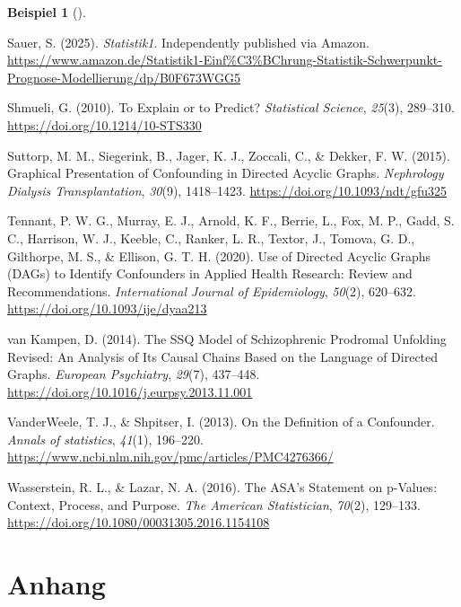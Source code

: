 \documentclass[
  ngerman,
  letterpaper,
  twoside,
  open=any]{scrbook}
\newlength{\cslhangindent}
\newenvironment{CSLReferences}[2] %
 {\begin{list}{}{%
  \setlength{\itemindent}{0pt}
  \setlength{\leftmargin}{0pt}
  \setlength{\parsep}{0pt}
  \ifodd #1
   \setlength{\leftmargin}{\cslhangindent}
   \setlength{\itemindent}{-1\cslhangindent}
  \fi
  \setlength{\itemsep}{#2\baselineskip}}}
 {\end{list}}
\theoremstyle{definition}
\newtheorem{example}{Beispiel}[chapter]
\theoremstyle{plain}
\theoremstyle{definition}
\theoremstyle{definition}
\theoremstyle{remark}
\begin{document}
\begin{example}[]
\begin{CSLReferences}{1}{0}
Sauer, S. (2025). \emph{Statistik1}. Independently published via Amazon.
\url{https://www.amazon.de/Statistik1-Einf\%C3\%BChrung-Statistik-Schwerpunkt-Prognose-Modellierung/dp/B0F673WGG5}

Shmueli, G. (2010). To {Explain} or to {Predict}? \emph{Statistical
Science}, \emph{25}(3), 289--310.
\url{https://doi.org/10.1214/10-STS330}

Suttorp, M. M., Siegerink, B., Jager, K. J., Zoccali, C., \& Dekker, F.
W. (2015). Graphical Presentation of Confounding in Directed Acyclic
Graphs. \emph{Nephrology Dialysis Transplantation}, \emph{30}(9),
1418--1423. \url{https://doi.org/10.1093/ndt/gfu325}

Tennant, P. W. G., Murray, E. J., Arnold, K. F., Berrie, L., Fox, M. P.,
Gadd, S. C., Harrison, W. J., Keeble, C., Ranker, L. R., Textor, J.,
Tomova, G. D., Gilthorpe, M. S., \& Ellison, G. T. H. (2020). Use of
Directed Acyclic Graphs ({DAGs}) to Identify Confounders in Applied
Health Research: Review and Recommendations. \emph{International Journal
of Epidemiology}, \emph{50}(2), 620--632.
\url{https://doi.org/10.1093/ije/dyaa213}

van Kampen, D. (2014). The {SSQ} Model of Schizophrenic Prodromal
Unfolding Revised: {An} Analysis of Its Causal Chains Based on the
Language of Directed Graphs. \emph{European Psychiatry}, \emph{29}(7),
437--448. \url{https://doi.org/10.1016/j.eurpsy.2013.11.001}

VanderWeele, T. J., \& Shpitser, I. (2013). On the Definition of a
Confounder. \emph{Annals of statistics}, \emph{41}(1), 196--220.
\url{https://www.ncbi.nlm.nih.gov/pmc/articles/PMC4276366/}

Wasserstein, R. L., \& Lazar, N. A. (2016). The {ASA}'s {Statement} on
p-{Values}: {Context}, {Process}, and {Purpose}. \emph{The American
Statistician}, \emph{70}(2), 129--133.
\url{https://doi.org/10.1080/00031305.2016.1154108}

\end{CSLReferences}

\part{Anhang}


\end{example}
\end{document}
